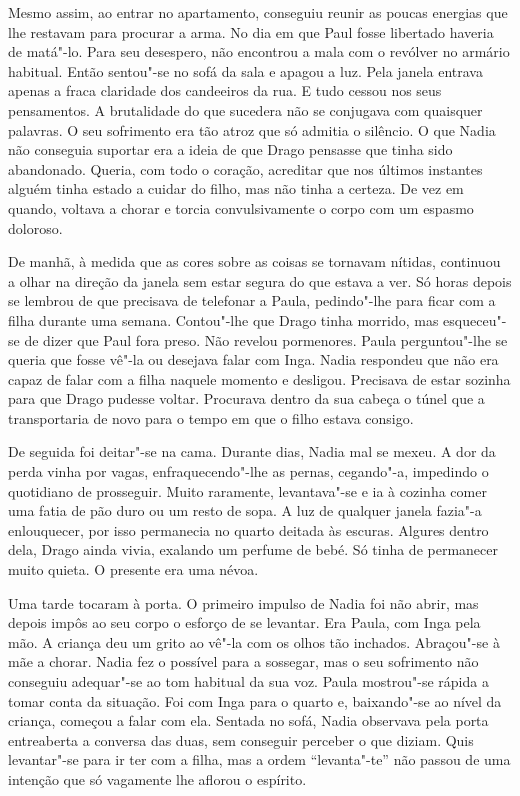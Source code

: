 Mesmo assim, ao entrar no apartamento, conseguiu
reunir as poucas energias que lhe restavam para procurar a arma. No dia
em que Paul fosse libertado haveria de matá"-lo. Para seu desespero, não
encontrou a mala com o
revólver no armário habitual. Então sentou"-se no sofá da sala e apagou a
luz. Pela janela entrava apenas a fraca claridade dos candeeiros da rua.
E tudo cessou nos seus pensamentos. A brutalidade do que sucedera não se
conjugava com quaisquer palavras. O seu sofrimento era tão atroz que
só admitia o silêncio. O que Nadia não conseguia suportar era a ideia
de que Drago pensasse que tinha sido abandonado. Queria, com todo o
coração, acreditar que nos últimos instantes alguém tinha estado a
cuidar do filho, mas não tinha a certeza. De vez em quando, voltava a
chorar e torcia convulsivamente o corpo com um espasmo doloroso.

De manhã, à medida que as cores sobre as coisas se tornavam nítidas,
continuou a olhar na direção da janela sem estar segura do que estava a
ver. Só horas depois se lembrou de que precisava de telefonar a Paula,
pedindo"-lhe para ficar com a filha durante uma semana. Contou"-lhe que
Drago tinha morrido, mas esqueceu"-se de dizer que Paul fora preso. Não
revelou pormenores. Paula perguntou"-lhe se queria que fosse vê"-la ou desejava falar com Inga. Nadia
respondeu que não era capaz de falar com a filha naquele momento e
desligou. Precisava de estar sozinha para que Drago pudesse voltar.
Procurava dentro da sua cabeça o túnel que a transportaria de novo para
o tempo em que o filho estava consigo.

De seguida foi deitar"-se na cama. Durante dias, Nadia mal se mexeu. A
dor da perda vinha por vagas, enfraquecendo"-lhe as pernas, cegando"-a,
impedindo o quotidiano de prosseguir. Muito raramente, levantava"-se e
ia à cozinha comer uma fatia de pão duro ou um resto de sopa.
A luz de qualquer janela fazia"-a enlouquecer, por isso permanecia no
quarto deitada às escuras. Algures dentro dela, Drago ainda vivia,
exalando um perfume de bebé. Só tinha de permanecer muito quieta. O
presente era uma névoa.

Uma tarde tocaram à porta. O primeiro impulso de Nadia foi não abrir,
mas depois impôs ao seu corpo o esforço de se levantar. Era Paula, com
Inga pela mão. A criança deu um grito ao vê"-la com os olhos tão
inchados. Abraçou"-se à mãe a chorar. Nadia fez o possível para a
sossegar, mas o seu sofrimento não conseguiu adequar"-se ao tom habitual
da sua voz. Paula mostrou"-se rápida a tomar conta da situação. Foi com
Inga para o quarto e, baixando"-se ao nível da criança, começou a falar com ela. Sentada no sofá, Nadia
observava pela porta entreaberta a conversa das duas, sem conseguir
perceber o que diziam. Quis levantar"-se para ir ter com a filha, mas a
ordem ``levanta"-te'' não passou de uma intenção que só vagamente lhe
aflorou o espírito.

